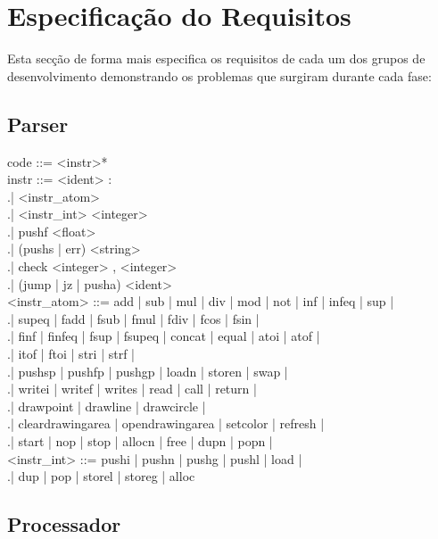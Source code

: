 \documentclass{report}
\begin{document}
\section{Especificação do Requisitos}
\quad Esta secção de forma mais especifica os requisitos de cada um dos grupos de desenvolvimento demonstrando os problemas que
surgiram durante cada fase:

\subsection{Parser}

\<code\> ::= <instr>*\\

\<instr\> ::= <ident> :\\
.\quad \quad| <instr_atom>\\
.\quad \quad| <instr_int> <integer>\\
.\quad \quad| pushf <float>\\
.\quad \quad| (pushs | err) <string>\\
.\quad \quad| check <integer> , <integer>\\
.\quad \quad| (jump | jz | pusha) <ident>\\

<instr_atom> ::= add | sub | mul | div | mod | not | inf | infeq | sup |\\
.\quad \quad| supeq | fadd | fsub | fmul | fdiv | fcos | fsin |\\
.\quad \quad| finf | finfeq | fsup | fsupeq | concat | equal | atoi | atof |\\
.\quad \quad| itof | ftoi | stri | strf |\\
.\quad \quad| pushsp | pushfp | pushgp | loadn | storen | swap |\\
.\quad \quad| writei | writef | writes | read | call | return |\\
.\quad \quad| drawpoint | drawline | drawcircle |\\
.\quad \quad| cleardrawingarea | opendrawingarea | setcolor | refresh |\\
.\quad \quad| start | nop | stop | allocn | free | dupn | popn |\\

<instr_int> ::= pushi | pushn | pushg | pushl | load |\\
.\quad \quad| dup | pop | storel | storeg | alloc\\


\subsection{Processador}
\end{document}
